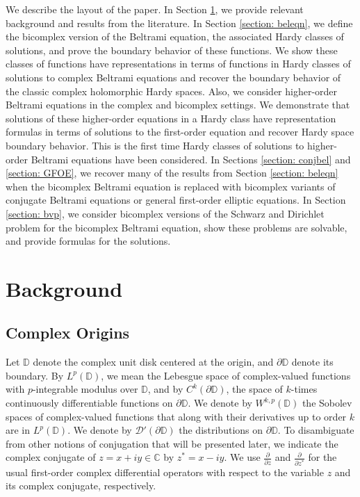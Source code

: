 \documentclass[12pt,reqno]{amsart}
\theoremstyle{definition}
\theoremstyle{remark}
\newcommand{\C}{\mathbb C}
\newcommand{\p}{\partial}
\newcommand{\disk}{\mathbb{D}}
\begin{document}
We describe the layout of the paper. In Section \ref{section: background}, we provide relevant background and results from the literature. In Section \ref{section: beleqn}, we define the bicomplex version of the Beltrami equation, the associated Hardy classes of solutions, and prove the boundary behavior of these functions. We show these classes of functions have representations in terms of functions in Hardy classes of solutions to complex Beltrami equations and recover the boundary behavior of the classic complex holomorphic Hardy spaces. Also, we consider higher-order Beltrami equations in the complex and bicomplex settings. We demonstrate that solutions of these higher-order equations in a Hardy class have representation formulas in terms of solutions to the first-order equation and recover Hardy space boundary behavior. This is the first time Hardy classes of solutions to higher-order Beltrami equations have been considered. In Sections \ref{section: conjbel} and \ref{section: GFOE}, we recover many of the results from Section \ref{section: beleqn} when the bicomplex Beltrami equation is replaced with bicomplex variants of conjugate Beltrami equations or general first-order elliptic equations. In Section \ref{section: bvp}, we consider bicomplex versions of the Schwarz and Dirichlet problem for the bicomplex Beltrami equation, show these problems are solvable, and provide formulas for the solutions.





\section{Background}\label{section: background}

    \subsection{Complex Origins}


        Let $\disk$ denote the complex unit disk centered at the origin, and $\p\disk$ denote its boundary. By $L^p(\disk)$, we mean the Lebesgue space of complex-valued functions with $p$-integrable modulus over $\disk$, and by $C^k(\p \disk)$, the space of $k$-times continuously differentiable functions on $\p\disk$. We denote by $W^{k,p}(\disk)$ the Sobolev spaces of complex-valued functions that along with their derivatives up to order $k$ are in $L^p(\disk)$. We denote by $\mathcal{D}'(\p\disk)$ the distributions on $\p \disk$. To disambiguate from other notions of conjugation that will be presented later, we indicate the complex conjugate of $z = x +iy \in \C$ by $z^* = x-iy$. We use $\frac{\p}{\p z}$ and $\frac{\p}{\p z^*}$ for the usual first-order complex differential operators with respect to the variable $z$ and its complex conjugate, respectively.
\end{document}
